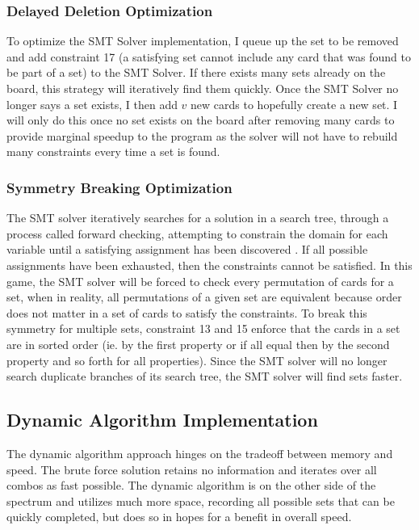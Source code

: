\documentclass[pageno]{jpaper}
\begin{document}
\subsubsection{Delayed Deletion Optimization}

To optimize the SMT Solver implementation, I queue up the set to be removed and add constraint 17 (a satisfying set cannot include any card that was found to be part of a set) to the SMT Solver. If there exists many sets already on the board, this strategy will iteratively find them quickly. Once the SMT Solver no longer says a set exists, I then add $v$ new cards to hopefully create a new set. I will only do this once no set exists on the board after removing many cards to provide marginal speedup to the program as the solver will not have to rebuild many constraints every time a set is found.


\subsubsection{Symmetry Breaking Optimization}

The SMT solver iteratively searches for a solution in a search tree, through a process called forward checking, attempting to constrain the domain for each variable until a satisfying assignment has been discovered \cite{search_from_AI}. If all possible assignments have been exhausted, then the constraints cannot be satisfied. In this game, the SMT solver will be forced to check every permutation of cards for a set, when in reality, all permutations of a given set are equivalent because order does not matter in a set of cards to satisfy the constraints. To break this symmetry for multiple sets, constraint 13 and 15 enforce that the cards in a set are in sorted order (ie. by the first property or if all equal then by the second property and so forth for all properties). Since the SMT solver will no longer search duplicate branches of its search tree, the SMT solver will find sets faster.

\subsection{Dynamic Algorithm Implementation}

The dynamic algorithm approach hinges on the tradeoff between memory and speed. The brute force solution retains no information and iterates over all combos as fast possible. The dynamic algorithm is on the other side of the spectrum and utilizes much more space, recording all possible sets that can be quickly completed, but does so in hopes for a benefit in overall speed. 
\end{document}
